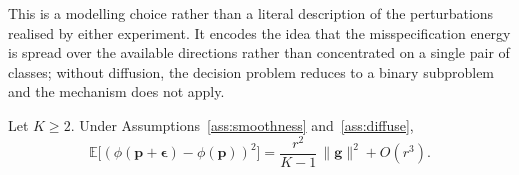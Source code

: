 This is a modelling choice rather than a literal description of the perturbations realised by either experiment. It encodes the idea that the misspecification energy is spread over the available directions rather than concentrated on a single pair of classes; without diffusion, the decision problem reduces to a binary subproblem and the mechanism does not apply.

\begin{lemma}\label{lem:dimensional_dilution}
    Let $K \geq 2$. Under Assumptions~\ref{ass:smoothness} and~\ref{ass:diffuse},
    \begin{equation}\label{eq:dimensional_dilution}
        \mathbb{E}\bigl[(\phi(\mathbf{p} + \boldsymbol{\epsilon}) - \phi(\mathbf{p}))^2\bigr] = \frac{r^2}{K-1}\,\|\mathbf{g}\|^2 + O(r^3).
    \end{equation}
\end{lemma}

